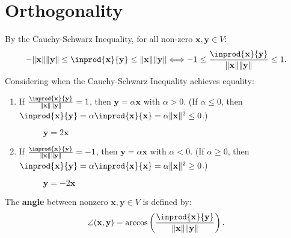 \documentclass{huhtakm-template-book-v2}
\begin{document}
\section{Orthogonality}
    By the Cauchy-Schwarz Inequality, for all non-zero $\mathbf{x}, \mathbf{y} \in V$:
    \begin{equation*}
        -\norm{\mathbf{x}}\norm{\mathbf{y}} \leq \inprod{\mathbf{x}}{\mathbf{y}} \leq \norm{\mathbf{x}}\norm{\mathbf{y}} \Longleftrightarrow -1 \leq \frac{\inprod{\mathbf{x}}{\mathbf{y}}}{\norm{\mathbf{x}}\norm{\mathbf{y}}} \leq 1.
    \end{equation*}
    Considering when the Cauchy-Schwarz Inequality achieves equality:
    \begin{enumerate}
        \item If $\frac{\inprod{\mathbf{x}}{\mathbf{y}}}{\norm{\mathbf{x}}\norm{\mathbf{y}}} = 1$, then $\mathbf{y} = \alpha\mathbf{x}$ with $\alpha > 0$. (If $\alpha \leq 0$, then $\inprod{\mathbf{x}}{\mathbf{y}} = \alpha\inprod{\mathbf{x}}{\mathbf{x}} = \alpha\norm{\mathbf{x}}^{2} \leq 0$.)
        \begin{figure}[h]
            \centering
            \caption{$\mathbf{y} = 2\mathbf{x}$}
        \end{figure}
        \item If $\frac{\inprod{\mathbf{x}}{\mathbf{y}}}{\norm{\mathbf{x}}\norm{\mathbf{y}}} = -1$, then $\mathbf{y} = \alpha\mathbf{x}$ with $\alpha < 0$. (If $\alpha \geq 0$, then $\inprod{\mathbf{x}}{\mathbf{y}} = \alpha\inprod{\mathbf{x}}{\mathbf{x}} = \alpha\norm{\mathbf{x}}^{2} \geq 0$.)
        \begin{figure}[h]
            \centering
            \caption{$\mathbf{y} = -2\mathbf{x}$}
        \end{figure}
    \end{enumerate}
    \begin{defn}
        The \textbf{angle} between nonzero $\mathbf{x}, \mathbf{y} \in V$ is defined by:
        \begin{equation*}
            \angle(\mathbf{x}, \mathbf{y}) = \arccos\left(\frac{\inprod{\mathbf{x}}{\mathbf{y}}}{\norm{\mathbf{x}}\norm{\mathbf{y}}}\right).
        \end{equation*}
    \end{defn}
\end{document}

